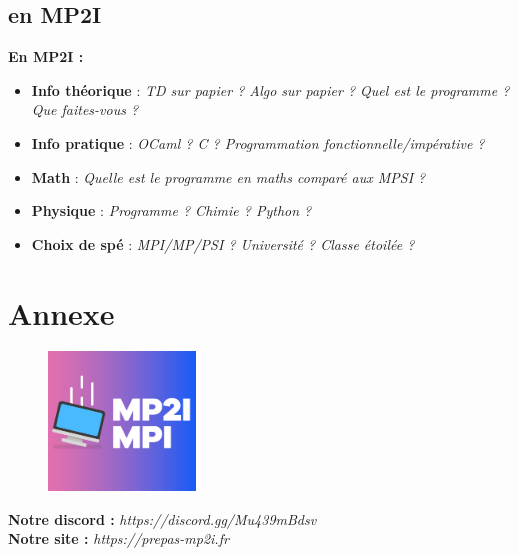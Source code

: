 \documentclass{beamer}
\begin{document}
\subsection{en MP2I}

\begin{frame}
    \textbf{En MP2I :}
    \begin{itemize}
        \item \textbf{Info théorique} : \textit{TD sur papier ? Algo sur papier ? Quel est le programme ? Que faites-vous ?}
        \item \textbf{Info pratique} : \textit{OCaml ? C ? Programmation fonctionnelle/impérative ?}
        \item \textbf{Math} : \textit{Quelle est le programme en maths comparé aux MPSI ?}
        \item \textbf{Physique} : \textit{Programme ? Chimie ? Python ? }
        \item \textbf{Choix de spé} : \textit{MPI/MP/PSI ? Université ? Classe étoilée ?}
    \end{itemize}
\end{frame}

\section{Annexe}

\begin{frame}
    \begin{figure}
        \centering
        \includegraphics[width=0.35\textwidth]{ressource_diapo/logo_discord.png}
    \end{figure}
    \textbf{Notre discord :} \textit{https://discord.gg/Mu439mBdsv}\\
    \textbf{Notre site :} \textit{https://prepas-mp2i.fr}
\end{frame}
\end{document}
